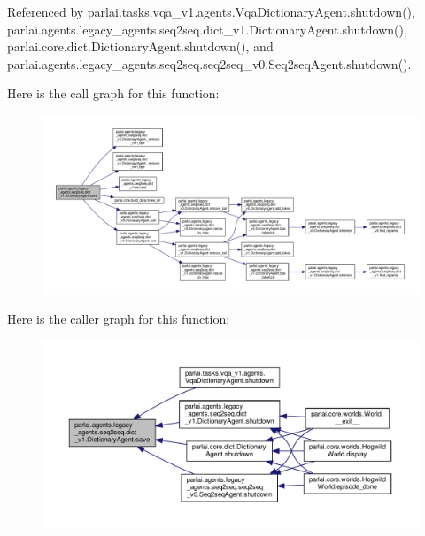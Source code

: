 Referenced by parlai.\+tasks.\+vqa\+\_\+v1.\+agents.\+Vqa\+Dictionary\+Agent.\+shutdown(), parlai.\+agents.\+legacy\+\_\+agents.\+seq2seq.\+dict\+\_\+v1.\+Dictionary\+Agent.\+shutdown(), parlai.\+core.\+dict.\+Dictionary\+Agent.\+shutdown(), and parlai.\+agents.\+legacy\+\_\+agents.\+seq2seq.\+seq2seq\+\_\+v0.\+Seq2seq\+Agent.\+shutdown().

Here is the call graph for this function\+:
\nopagebreak
\begin{figure}[H]
\begin{center}
\leavevmode
\includegraphics[width=350pt]{classparlai_1_1agents_1_1legacy__agents_1_1seq2seq_1_1dict__v1_1_1DictionaryAgent_aacac3c53a7aef02a731d427fcb8bdf87_cgraph}
\end{center}
\end{figure}
Here is the caller graph for this function\+:
\nopagebreak
\begin{figure}[H]
\begin{center}
\leavevmode
\includegraphics[width=350pt]{classparlai_1_1agents_1_1legacy__agents_1_1seq2seq_1_1dict__v1_1_1DictionaryAgent_aacac3c53a7aef02a731d427fcb8bdf87_icgraph}
\end{center}
\end{figure}
\mbox{\label{classparlai_1_1agents_1_1legacy__agents_1_1seq2seq_1_1dict__v1_1_1DictionaryAgent_a7322a3d5e19a0c52cd76d4682cccf46c}} 
